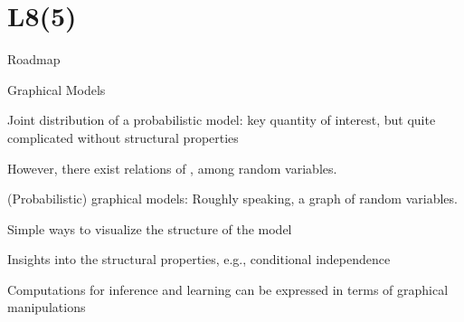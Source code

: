 \documentclass[handout,fleqn,aspectratio=169]{beamer}
\begin{document}


\section{L8(5)}
\begin{frame}{Roadmap}

\plitemsep 0.1in

\bce[(1)] 

\item {}
\item {} 
\item {}
\item {} 
\item {}
\item {}
\ece
\end{frame}

\begin{frame}{Graphical Models}

\plitemsep 0.1in

\bci 

\item Joint distribution of a probabilistic model: key quantity of interest, but quite complicated without structural properties

\item However, there exist relations of ,  among random variables.  

\item (Probabilistic) graphical models: Roughly speaking, a graph of random variables.

\bci
\item Simple ways to visualize the structure of the model
\item Insights into the structural properties, e.g., conditional independence
\item Computations for inference and learning can be expressed in terms of graphical manipulations
\eci
\eci
\end{frame}
\end{document}
